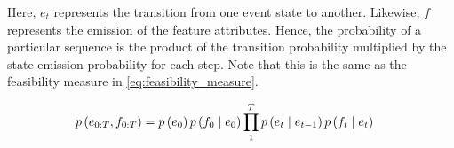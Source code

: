 \documentclass[./../../paper.tex]{subfiles}
\begin{document}

% 




\noindent Here, $e_t$ represents the transition from one event state to another. Likewise, $f$ represents the emission of the feature attributes. Hence, the probability of a particular sequence is the product of the transition probability multiplied by the state emission probability for each step. Note that this is the same as the feasibility measure in \autoref{eq:feasibility_measure}. 

\begin{align}
    p\left(e_{0:T},f_{0:T}\right) & = p\left(e_0\right)p\left(f_0 \mid e_0\right)\prod_1^T p\left(e_t \mid e_{t-1}\right) p\left(f_t \mid e_t\right)
    \label{eq:feasibility_measure}
\end{align}







\end{document}
